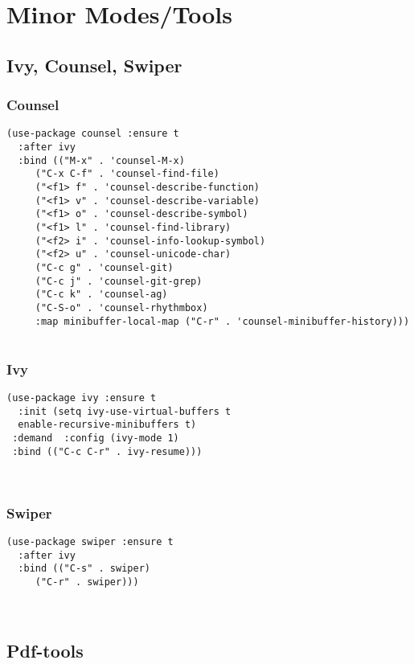 \documentclass[11pt]{article}
\begin{document}
\section{Minor Modes/Tools}
\label{sec:org93e6d51}
\subsection{Ivy, Counsel, Swiper}
\label{sec:org15cc2f7}
\subsubsection{Counsel}
\label{sec:org3687f29}
\begin{verbatim}
(use-package counsel :ensure t
  :after ivy
  :bind (("M-x" . 'counsel-M-x)
	 ("C-x C-f" . 'counsel-find-file)
	 ("<f1> f" . 'counsel-describe-function)
	 ("<f1> v" . 'counsel-describe-variable)
	 ("<f1> o" . 'counsel-describe-symbol)
	 ("<f1> l" . 'counsel-find-library)
	 ("<f2> i" . 'counsel-info-lookup-symbol)
	 ("<f2> u" . 'counsel-unicode-char)
	 ("C-c g" . 'counsel-git)
	 ("C-c j" . 'counsel-git-grep)
	 ("C-c k" . 'counsel-ag)
	 ("C-S-o" . 'counsel-rhythmbox)
	 :map minibuffer-local-map ("C-r" . 'counsel-minibuffer-history)))


\end{verbatim}
\subsubsection{Ivy}
\label{sec:org0ff931f}
\begin{verbatim}
(use-package ivy :ensure t
  :init (setq ivy-use-virtual-buffers t
  enable-recursive-minibuffers t)
 :demand  :config (ivy-mode 1)
 :bind (("C-c C-r" . ivy-resume)))



\end{verbatim}
\subsubsection{Swiper}
\label{sec:orgabc11dd}
\begin{verbatim}
(use-package swiper :ensure t
  :after ivy
  :bind (("C-s" . swiper)
	 ("C-r" . swiper)))



\end{verbatim}

\subsection{Pdf-tools}
\label{sec:org56e6dfc}
\end{document}
